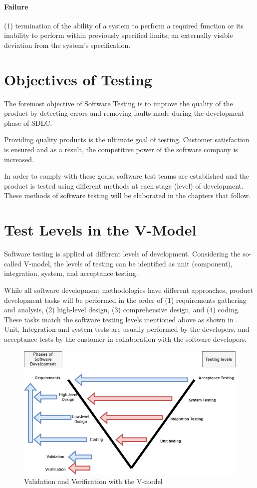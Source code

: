 \paragraph{Failure}
(1) termination of the ability of a system to perform a required function or its inability to perform within previously specified limits; an externally visible deviation from the system's specification.

\section{Objectives of Testing}
The foremost objective of Software Testing is to improve the quality of the product by detecting errors and removing faults made during the development phase of SDLC. 

Providing quality products is the ultimate goal of testing. Customer satisfaction is ensured and as a result, the competitive power of the software company is increased.

In order to comply with these goals, software test teams are established and the product is tested using different methods at each stage (level) of development. These methods of software testing will be elaborated in the chapters that follow.

\section{Test Levels in the V-Model}
Software testing is applied at different levels of development. Considering the so-called V-model, the levels of testing can be identified as unit (component), integration, system, and acceptance testing. 

While all software development methodologies have different approaches, product development tasks will be performed in the order of (1) requirements gathering and analysis, (2) high-level design, (3) comprehensive design, and (4) coding. 
These tasks match the software testing levels mentioned above as shown in . Unit, Integration and system tests are usually performed by the developers, and acceptance tests by the customer in collaboration with the software developers.

\begin{figure}[!ht]
    \includegraphics{images/v-model.png}
    \caption{Validation and Verification with the V-model}
\end{figure}

